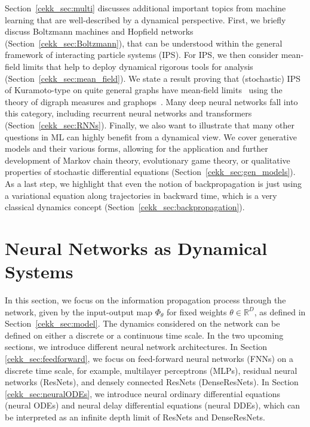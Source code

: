 \documentclass[10pt]{article}
\newcommand{\R}{{\mathbb R}}
\def\R{\mathbb{R}}
\begin{document}
Section~\ref{cekk_sec:multi} discusses additional important topics from machine learning that are well-described by a dynamical perspective. First, we briefly discuss Boltzmann machines and Hopfield networks (Section~\ref{cekk_sec:Boltzmann}), that can be understood within the general framework of interacting particle systems (IPS). For IPS, we then consider mean-field limits that help to deploy dynamical rigorous tools for analysis (Section~\ref{cekk_sec:mean_field}). We state a result proving that (stochastic) IPS of Kuramoto-type on quite general graphs have mean-field limits~\cite{KuehnPulido} using the theory of digraph measures and graphops~\cite{KuehnGraphops,KuehnXu}. Many deep neural networks fall into this category, including recurrent neural networks and transformers (Section~\ref{cekk_sec:RNNs}). Finally, we also want to illustrate that many other questions in ML can highly benefit from a dynamical view. We cover generative models and their various forms, allowing for the application and further development of Markov chain theory, evolutionary game theory, or qualitative properties of stochastic differential equations (Section~\ref{cekk_sec:gen_models}). As a last step, we highlight that even the notion of backpropagation is just using a variational equation along trajectories in backward time, which is a very classical dynamics concept (Section~\ref{cekk_sec:backpropagation}).

\section{Neural Networks as Dynamical Systems}\label{cekk_sec:neural}

In this section, we focus on the information propagation process through the network, given by the input-output map  $\Phi_\theta$ for fixed weights $\theta\in\R^D$, as defined in Section~\ref{cekk_sec:model}. The dynamics considered on the network can be defined on either a discrete or a continuous time scale. In the two upcoming sections, we introduce different neural network architectures. In Section \ref{cekk_sec:feedforward}, we focus on feed-forward neural networks (FNNs)  on a discrete time scale, for example, multilayer perceptrons (MLPs), residual neural networks (ResNets), and densely connected ResNets (DenseResNets). In Section \ref{cekk_sec:neuralODEs}, we introduce neural ordinary differential equations (neural ODEs) and neural delay differential equations (neural DDEs), which can be interpreted as an infinite depth limit of ResNets and DenseResNets.
\end{document}
